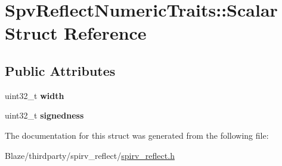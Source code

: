\hypertarget{structSpvReflectNumericTraits_1_1Scalar}{}\section{Spv\+Reflect\+Numeric\+Traits\+:\+:Scalar Struct Reference}
\label{structSpvReflectNumericTraits_1_1Scalar}
\subsection*{Public Attributes}
\begin{DoxyCompactItemize}
\item 
\mbox{\label{structSpvReflectNumericTraits_1_1Scalar_a68ca3222813cdf26592f44a3e128b575}} 
uint32\+\_\+t {\bfseries width}
\item 
\mbox{\label{structSpvReflectNumericTraits_1_1Scalar_a5a4e28e94bf4d24b50f45164a07565b6}} 
uint32\+\_\+t {\bfseries signedness}
\end{DoxyCompactItemize}


The documentation for this struct was generated from the following file\+:\begin{DoxyCompactItemize}
\item 
Blaze/thirdparty/spirv\+\_\+reflect/\hyperlink{spirv__reflect_8h}{spirv\+\_\+reflect.\+h}\end{DoxyCompactItemize}
